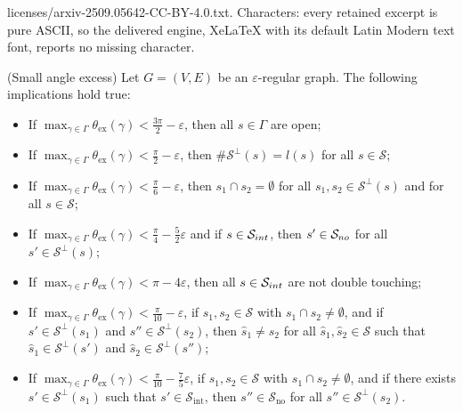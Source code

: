 \documentclass[10pt,a4paper]{amsart}
\newcommand{\eps}{\varepsilon}
\begin{document}
licenses/arxiv-2509.05642-CC-BY-4.0.txt. Characters: every retained excerpt is pure ASCII, so the delivered engine, XeLaTeX with its default Latin Modern text font, reports no missing character.
\begin{lemma}(Small angle excess)\label{lemma:excess} Let $G=(V,E)$ be an $\eps$-regular graph. The following implications hold true:
\begin{itemize}
\item[\rm (i)] If  $\displaystyle\max_{\gamma \in \Gamma} \theta_{\mathrm{ex}}(\gamma) < \frac{3\pi}{2}-\eps   $, then all $s \in \Gamma$ are open;
\item[\rm (ii)]  If $\displaystyle \max_{\gamma \in \Gamma} \theta_{\mathrm{ex}}(\gamma) < \frac{\pi}{2}-\varepsilon$, then $\#\mathcal{S}^\perp(s) = l(s)$ for all $s \in \mathcal{S}$;
\item[\rm (iii)] If $\displaystyle \max_{\gamma \in \Gamma} \theta_{\mathrm{ex}}(\gamma) < \frac{\pi}{6}-\varepsilon$, then $s_1 \cap s_2= \emptyset$ for all $s_1,s_2 \in \mathcal{S}^\perp(s)$ and for all $s \in \mathcal{S}$;
\item[\rm (iv)] If $\displaystyle \max_{\gamma \in \Gamma} \theta_{\mathrm{ex}}(\gamma) <\frac{\pi}{4}-\frac{5}{2}\varepsilon  $  and if $s\in \mathcal{S}_{\rm int}$, then $s' \in \mathcal{S}_{\rm no}$ for all $s' \in \mathcal{S}^\perp(s)$; 
\item[\rm (v)] If $\displaystyle \max_{\gamma \in \Gamma} \theta_{\mathrm{ex}}(\gamma) < \pi-4\varepsilon$, then all $s \in\mathcal{S}_{\rm int}$ are not double touching;
\item[\rm (vi)] If $\displaystyle \max_{\gamma \in \Gamma} \theta_{\mathrm{ex}}(\gamma) <\frac{\pi}{10}-\varepsilon$, if  $s_1,s_2 \in \mathcal{S}$ with $s_1 \cap s_2 \neq \emptyset$,  and if   $s' \in \mathcal{S}^\perp(s_1)$ and $s'' \in \mathcal{S}^\perp(s_2)$, then  $\hat{s}_1 \neq \hat{s}_2$ for all  $\hat{s}_1,\hat{s}_2 \in \mathcal{S}$ such that $\hat{s}_1 \in \mathcal{S}^\perp(s') $ and   $\hat{s}_2 \in \mathcal{S}^\perp(s'') $;
\item[\rm (vii)] If $\displaystyle \max_{\gamma \in \Gamma} \theta_{\mathrm{ex}}(\gamma) <\frac{\pi}{10}-  \frac{7}{5}  \varepsilon$, if  $s_1,s_2 \in \mathcal{S}$ with $s_1 \cap s_2 \neq \emptyset$,  and if there exists  $s' \in \mathcal{S}^\perp(s_1)$ such that $s'\in \mathcal{S}_\mathrm{int}$, then $s''\in \mathcal{S}_{\mathrm{no}}$ for all  $s'' \in \mathcal{S}^\perp(s_2)$.   
\end{itemize}
\end{lemma}
\end{document}
